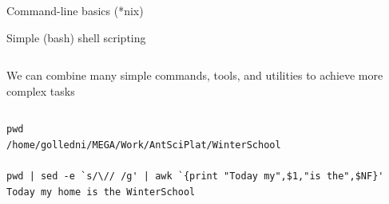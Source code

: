 \begin{frame}{\insertsectionnumber{ |} Command-line basics (*nix)}
\end{frame}


\begin{frame}[fragile]{\insertsectionnumber{ |} Simple (bash) shell scripting}



\begin{columns}
\column[c]{7.5cm}
\begin{itemize}

\begin{beamerboxesrounded}[lower=gray,shadow=true]{
\item We can combine many simple commands, tools, and utilities to achieve more complex tasks
}
\end{beamerboxesrounded}
\end{itemize}
\end{columns}

\vspace*{1cm}\begin{lstlisting}
pwd
/home/golledni/MEGA/Work/AntSciPlat/WinterSchool

pwd | sed -e `s/\// /g' | awk `{print "Today my",$1,"is the",$NF}'
Today my home is the WinterSchool
\end{lstlisting}


\begin{beamerboxesrounded}[lower=gray,shadow=true]{
\vspace*{0.5cm}
}
\end{beamerboxesrounded}

\end{frame}



